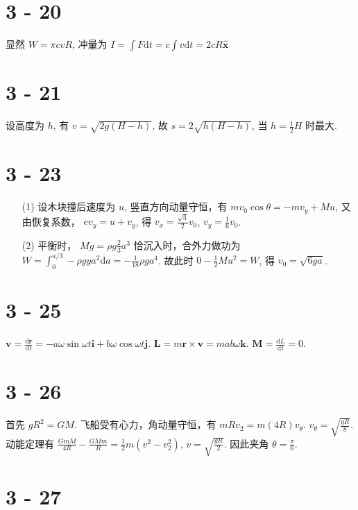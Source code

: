 \documentclass{article}
\newcommand{\dd}{\mathrm{d}}
\begin{document}
\section*{3 - 20}

显然 $W = \pi c vR$, 冲量为 $I = \int F\dd t = c \int v \dd t = 2cR\hat{\boldsymbol{x}}$

\section*{3 - 21}

设高度为 $h$, 有 $v = \sqrt{2g(H - h)}$, 故 $s = 2\sqrt{h(H - h)}$, 当 $h = \frac{1}{2}H$ 时最大.

\section*{3 - 23}

\begin{itemize}
    \item [(1)] 设木块撞后速度为 $u$, 竖直方向动量守恒，有 $mv_0\cos \theta = -mv_y + Mu$, 又由恢复系数， $ev_y = u + v_y$, 得 $v_x = \frac{\sqrt{3}}{2}v_0$, $v_y = \frac{1}{6}v_0$.
    \item [(2)] 平衡时， $Mg = \rho g \frac{2}{3}a^3$ 恰沉入时，合外力做功为 $W = \int_{0}^{a/3} -\rho g y a^2 \dd a = -\frac{1}{18}\rho g a^4$. 故此时 $0 - \frac{1}{2}Mu^2 = W$, 得 $v_0 = \sqrt{6ga}$.
\end{itemize}

\section*{3 - 25}

$\boldsymbol{v} = \frac{\dd \boldsymbol{r}}{\dd t} = -a\omega \sin \omega t \boldsymbol{i} + b\omega\cos \omega t \boldsymbol{j}$. $\boldsymbol{L} = m\boldsymbol{r}\times \boldsymbol{v} = mab\omega \boldsymbol{k}$. $\boldsymbol{M} = \frac{\dd L}{\dd t} = 0$.

\section*{3 - 26}

首先 $gR^2 = GM$. 飞船受有心力，角动量守恒，有 $mRv_2 = m(4R)v_\theta$. $v_\theta = \sqrt{\frac{gR}{8}}$. 动能定理有 $\frac{GmM}{4R} - \frac{GMm}{R} = \frac{1}{2}m(v^2 - v_2^2)$, $v = \sqrt{\frac{gR}{2}}$. 因此夹角 $\theta = \frac{\pi}{6}$.

\section*{3 - 27}
\end{document}
